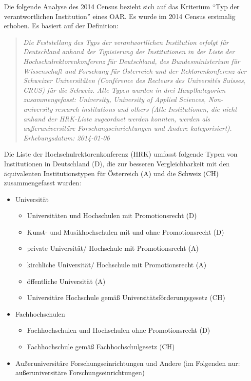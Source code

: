 \documentclass[a4paper,
fontsize=11pt,
oneside,
numbers=noperiodatend,
parskip=half-,
bibliography=totoc,
final
]{scrartcl}
\begin{document}
Die folgende Analyse des 2014 Census bezieht sich auf das Kriterium
\enquote{Typ der verantwortlichen Institution} eines OAR. Es wurde im
2014 Census erstmalig erhoben. Es basiert auf der Definition:

\begin{quote}
\emph{Die Feststellung des Typs der verantwortlichen Institution erfolgt
für Deutschland anhand der Typisierung der Institutionen in der Liste
der Hochschulrektorenkonferenz für Deutschland, des Bundesministerium
für Wissenschaft und Forschung für Österreich und der Rektorenkonferenz
der Schweizer Universitäten (Conférence des Recteurs des Universités
Suisses, CRUS) für die Schweiz. Alle Typen wurden in drei
Hauptkategorien zusammengefasst: University, University of Applied
Sciences, Non-university research institutions and others (Alle
Institutionen, die nicht anhand der HRK-Liste zugeordnet werden konnten,
werden als außeruniversitäre Forschungseinrichtungen und Andere
kategorisiert). Erhebungsdatum: 2014-01-06}
\end{quote}

Die Liste der Hochschulrektorenkonferenz (HRK) umfasst folgende Typen
von Institutionen in Deutschland (D), die zur besseren Vergleichbarkeit
mit den äquivalenten Institutionstypen für Österreich (A) und die
Schweiz (CH) zusammengefasst wurden:

\begin{itemize}
\item
  Universität

  \begin{itemize}
  \item
    Universitäten und Hochschulen mit Promotionsrecht (D)
  \item
    Kunst- und Musikhochschulen mit und ohne Promotionsrecht (D)
  \item
    private Universität/ Hochschule mit Promotionsrecht (A)
  \item
    kirchliche Universität/ Hochschule mit Promotionsrecht (A)
  \item
    öffentliche Universität (A)
  \item
    Universitäre Hochschule gemäß Universitätsförderungsgesetz (CH)
  \end{itemize}
\end{itemize}

\begin{itemize}
\item
  Fachhochschulen

  \begin{itemize}
  \item
    Fachhochschulen und Hochschulen ohne Promotionsrecht (D)
  \item
    Fachhochschule gemäß Fachhochschulgesetz (CH)
  \end{itemize}
\item
  Außeruniversitäre Forschungseinrichtungen und Andere (im Folgenden
  nur: außeruniversitäre Forschungseinrichtungen)
\end{itemize}
\end{document}
